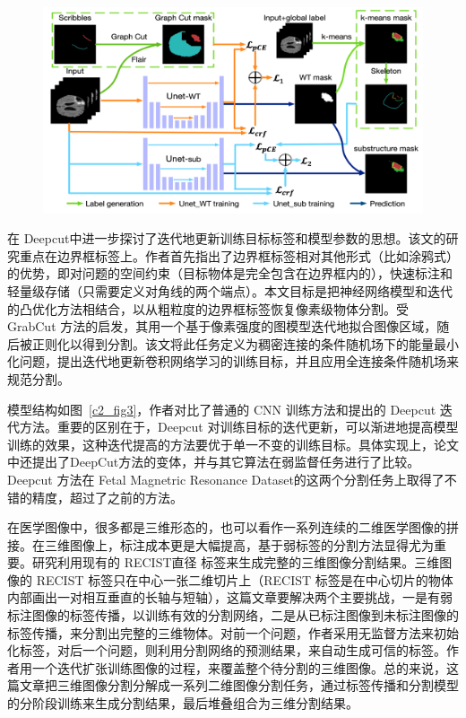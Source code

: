     \begin{figure}[tbp]
        \centering 
        \includegraphics[width=1.0\textwidth]{img/c2/rel_a5.png}
        \label{c2_fig5}
    \end{figure}


在 Deepcut\citep{rajchl2016deepcut}中进一步探讨了迭代地更新训练目标标签和模型参数的思想。该文的研究重点在边界框标签上。作者首先指出了边界框标签相对其他形式（比如涂鸦式）的优势，即对问题的空间约束（目标物体是完全包含在边界框内的），快速标注和轻量级存储（只需要定义对角线的两个端点）。本文目标是把神经网络模型和迭代的凸优化方法相结合，以从粗粒度的边界框标签恢复像素级物体分割。受 GrabCut 方法的启发，其用一个基于像素强度的图模型迭代地拟合图像区域，随后被正则化以得到分割。该文将此任务定义为稠密连接的条件随机场下的能量最小化问题，提出迭代地更新卷积网络学习的训练目标，并且应用全连接条件随机场来规范分割。

模型结构如图~\ref{c2_fig3}，作者对比了普通的 CNN 训练方法和提出的 Deepcut 迭代方法。重要的区别在于，Deepcut 对训练目标的迭代更新，可以渐进地提高模型训练的效果，这种迭代提高的方法要优于单一不变的训练目标。具体实现上，论文中还提出了DeepCut方法的变体，并与其它算法在弱监督任务进行了比较。Deepcut 方法在 Fetal Magnetric Resonance Dataset\citep{damodaram2012foetal}的这两个分割任务上取得了不错的精度，超过了之前的方法。

在医学图像中，很多都是三维形态的，也可以看作一系列连续的二维医学图像的拼接。在三维图像上，标注成本更是大幅提高，基于弱标签的分割方法显得尤为重要。\citet{cai2018accurate}研究利用现有的 RECIST直径 标签来生成完整的三维图像分割结果。三维图像的 RECIST 标签只在中心一张二维切片上（RECIST 标签是在中心切片的物体内部画出一对相互垂直的长轴与短轴），这篇文章要解决两个主要挑战，一是有弱标注图像的标签传播，以训练有效的分割网络，二是从已标注图像到未标注图像的标签传播，来分割出完整的三维物体。对前一个问题，作者采用无监督方法来初始化标签，对后一个问题，则利用分割网络的预测结果，来自动生成可信的标签。作者用一个迭代扩张训练图像的过程，来覆盖整个待分割的三维图像。总的来说，这篇文章把三维图像分割分解成一系列二维图像分割任务，通过标签传播和分割模型的分阶段训练来生成分割结果，最后堆叠组合为三维分割结果。

